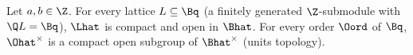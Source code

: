 Let $a,b\in\Z$. For every lattice $L\subseteq\Bq$ (a finitely generated $\Z$-submodule with $\Q L=\Bq$), $\Lhat$ is compact and open in $\Bhat$. For every order
$\Oord$ of $\Bq$, $\Ohat^\times$ is a compact open subgroup of $\Bhat^\times$ (units topology).
